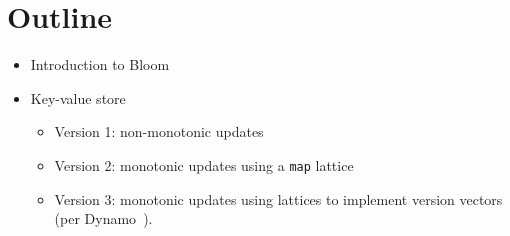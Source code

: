 \documentclass{sig-alternate}
\begin{document}
\section{Outline}

\begin{itemize}
\item
  Introduction to Bloom
\item
  Key-value store
  \begin{itemize}
  \item
    Version 1: non-monotonic updates
  \item
    Version 2: monotonic updates using a \texttt{map} lattice
  \item
    Version 3: monotonic updates using lattices to implement version vectors
    (per Dynamo~\cite{DeCandia2007}).
  \end{itemize}
\end{itemize}



\end{document}
